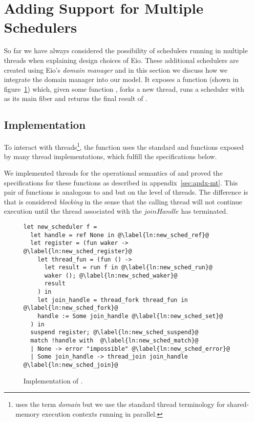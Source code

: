 \section{Adding Support for Multiple Schedulers}
\label{sec:domain-manager}

So far we have always considered the possibility of schedulers running in multiple threads when explaining design choices of Eio.
These additional schedulers are created using Eio's \emph{domain manager} and in this section we discuss how we integrate the domain manager into our model.
It exposes a function  (shown in figure~\ref{fig:dm-impl}) which, given some function , forks a new thread, runs a scheduler with  as its main fiber and returns the final result of .

\subsection{Implementation}
To interact with threads\footnote{\ocf{} uses the term \emph{domain} but we use the standard thread terminology for shared-memory execution contexts running in parallel.},
the function uses the standard  and  functions exposed by many thread implementations, which fulfill the specifications below.
%
We implemented threads for the operational semantics of \hazel{} and proved the specifications for these functions as described in appendix~\ref{sec:apdx-mt}.
This pair of functions is analogous to  and  but on the level of threads.
The difference is that  is considered \emph{blocking} in the sense that the calling thread will not continue execution until the thread associated with the \(joinHandle\) has terminated.

\begin{figure}[ht]
  \begin{verbatim}
let new_scheduler f = 
  let handle = ref None in @\label{ln:new_sched_ref}@
  let register = (fun waker -> @\label{ln:new_sched_register}@ 
    let thread_fun = (fun () ->
      let result = run f in @\label{ln:new_sched_run}@
      waker (); @\label{ln:new_sched_waker}@
      result
    ) in
    let join_handle = thread_fork thread_fun in @\label{ln:new_sched_fork}@
    handle := Some join_handle @\label{ln:new_sched_set}@
  ) in
  suspend register; @\label{ln:new_sched_suspend}@
  match !handle with  @\label{ln:new_sched_match}@
  | None -> error "impossible" @\label{ln:new_sched_error}@
  | Some join_handle -> thread_join join_handle @\label{ln:new_sched_join}@
\end{verbatim}
  \caption{Implementation of .}
  \label{fig:dm-impl}
\end{figure}

